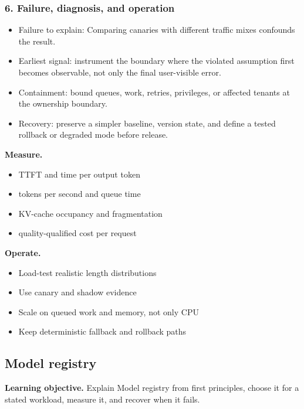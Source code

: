 \subsubsection*{6. Failure, diagnosis, and operation}
\begin{itemize}
\item Failure to explain: Comparing canaries with different traffic mixes confounds the result.
\item Earliest signal: instrument the boundary where the violated assumption first becomes observable, not only the final user-visible error.
\item Containment: bound queues, work, retries, privileges, or affected tenants at the ownership boundary.
\item Recovery: preserve a simpler baseline, version state, and define a tested rollback or degraded mode before release.
\end{itemize}
\textbf{Measure.}\begin{itemize}
\item TTFT and time per output token
\item tokens per second and queue time
\item KV-cache occupancy and fragmentation
\item quality-qualified cost per request
\end{itemize}
\textbf{Operate.}\begin{itemize}
\item Load-test realistic length distributions
\item Use canary and shadow evidence
\item Scale on queued work and memory, not only CPU
\item Keep deterministic fallback and rollback paths
\end{itemize}
\subsection{Model registry}
\textbf{Learning objective.} Explain Model registry from first principles, choose it for a stated workload, measure it, and recover when it fails.
